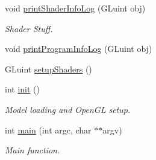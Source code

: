 \begin{DoxyCompactItemize}
void \hyperlink{model_8cu_a776b9402dbf22819c675dcd214f8bc90}{print\-Shader\-Info\-Log} (G\-Luint obj)
\begin{DoxyCompactList}\small\item\em Shader Stuff. \end{DoxyCompactList}\item 
void \hyperlink{model_8cu_a5012d81306e629e18157e5dd570163e1}{print\-Program\-Info\-Log} (G\-Luint obj)
\item 
G\-Luint \hyperlink{model_8cu_a16dffda163716a857e0e767d1f35d806}{setup\-Shaders} ()
\item 
int \hyperlink{model_8cu_a05848de25ac2dbec233935058a1d24b4}{init} ()
\begin{DoxyCompactList}\small\item\em Model loading and Open\-G\-L setup. \end{DoxyCompactList}\item 
int \hyperlink{model_8cu_a3c04138a5bfe5d72780bb7e82a18e627}{main} (int argc, char $\ast$$\ast$argv)
\begin{DoxyCompactList}\small\item\em Main function. \end{DoxyCompactList}\end{DoxyCompactItemize}
